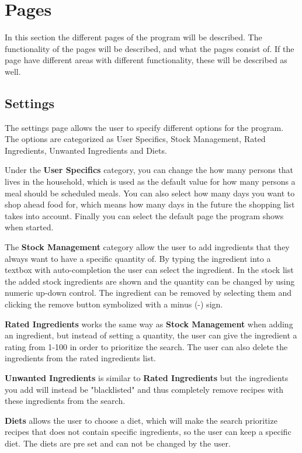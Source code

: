\chapter{Pages}
In this section the different pages of the program will be described. The functionality of the pages will be described, and what the pages consist of. If the page have different areas with different functionality, these will be described as well.

\section{Settings} \label{ss:settings}
The settings page allows the user to specify different options for the program. The options are categorized as User Specifics, Stock Management, Rated Ingredients, Unwanted Ingredients and Diets.

Under the \textbf{User Specifics} category, you can change the how many persons that lives in the household, which is used as the default value for how many persons a meal should be scheduled meals. You can also select how many days you want to shop ahead food for, which means how many days in the future the shopping list takes into account. Finally you can select the default page the program shows when started.

The \textbf{Stock Management} category allow the user to add ingredients that they always want to have a specific quantity of. By typing the ingredient into a textbox with auto-completion the user can select the ingredient. In the stock list the added stock ingredients are shown and the quantity can be changed by using numeric up-down control. The ingredient can be removed by selecting them and clicking the remove button symbolized with a minus (-) sign.

\textbf{Rated Ingredients} works the same way as \textbf{Stock Management} when adding an ingredient, but instead of setting a quantity, the user can give the ingredient a rating from 1-100 in order to prioritize the search. The user can also delete the ingredients from the rated ingredients list.

\textbf{Unwanted Ingredients} is similar to \textbf{Rated Ingredients} but the ingredients you add will instead be "blacklisted" and thus completely remove recipes with these ingredients from the search.

\textbf{Diets} allows the user to choose a diet, which will make the search prioritize recipes that does not contain specific ingredients, so the user can keep a specific diet. The diets are pre set and can not be changed by the user.

